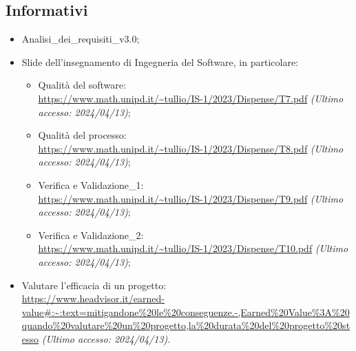 \subsection{Informativi}
\begin{itemize}
    \item Analisi\_dei\_requisiti\_v3.0;
    \item Slide dell’insegnamento di Ingegneria del Software, in particolare:
        \begin{itemize}
            \item Qualità del software: \\ \url{https://www.math.unipd.it/~tullio/IS-1/2023/Dispense/T7.pdf} \textit{(Ultimo accesso: 2024/04/13)};
            \item Qualità del processo:\\ \url{https://www.math.unipd.it/~tullio/IS-1/2023/Dispense/T8.pdf} \textit{(Ultimo accesso: 2024/04/13)};
            \item Verifica e Validazione\_1:\\ \url{https://www.math.unipd.it/~tullio/IS-1/2023/Dispense/T9.pdf} \textit{(Ultimo accesso: 2024/04/13)};
            \item Verifica e Validazione\_2:\\ \url{https://www.math.unipd.it/~tullio/IS-1/2023/Dispense/T10.pdf} \textit{(Ultimo accesso: 2024/04/13)};
        \end{itemize}
    \item Valutare l'efficacia di un progetto: \\ \url{https://www.headvisor.it/earned-value#:~:text=mitigandone%20le%20conseguenze.-,Earned%20Value%3A%20quando%20valutare%20un%20progetto,la%20durata%20del%20progetto%20stesso} \textit{(Ultimo accesso: 2024/04/13)}.
\end{itemize}
